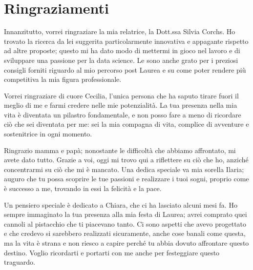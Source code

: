 \pagestyle{fancy}

\fancyhf{}

\fancyfoot[C]{}


\chapter*{Ringraziamenti}

\large

Innanzitutto, vorrei ringraziare la mia relatrice, la Dott.ssa Silvia Corchs. Ho trovato la ricerca da lei suggerita particolarmente innovativa e appagante rispetto ad altre proposte; questo mi ha dato modo di mettermi in gioco nel lavoro e di sviluppare una passione per la data science. Le sono anche grato per i preziosi consigli forniti riguardo al mio percorso post Laurea e su come poter rendere più competitiva la mia figura professionale.

\bigskip

Vorrei ringraziare di cuore Cecilia, l'unica persona che ha saputo tirare fuori il meglio di me e farmi credere nelle mie potenzialità. La tua presenza nella mia vita è diventata un pilastro fondamentale, e non posso fare a meno di ricordare ciò che sei diventata per me: sei la mia compagna di vita, complice di avventure e sostenitrice in ogni momento.

\bigskip

Ringrazio mamma e papà; nonostante le difficoltà che abbiamo affrontato, mi avete dato tutto. Grazie a voi, oggi mi trovo qui a riflettere su ciò che ho, anziché concentrarmi su ciò che mi è mancato. Una dedica speciale va mia sorella Ilaria; auguro che tu possa scoprire le tue passioni e realizzare i tuoi sogni, proprio come è successo a me, trovando in essi la felicità e la pace.

\bigskip

Un pensiero speciale è dedicato a Chiara, che ci ha lasciato alcuni mesi fa. Ho sempre immaginato la tua presenza alla mia festa di Laurea; avrei comprato quei cannoli al pistacchio che ti piacevano tanto. Ci sono aspetti che avevo progettato e che credevo si sarebbero realizzati sicuramente, anche cose banali come questa, ma la vita è strana e non riesco a capire perché tu abbia dovuto affrontare questo destino. Voglio ricordarti e portarti con me anche per festeggiare questo traguardo.